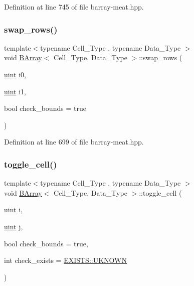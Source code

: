Definition at line 745 of file barray-\/meat.\+hpp.

\mbox{\label{class_b_array_a742773803481c18e2865b2b2a1e68949}} 
\subsubsection{\texorpdfstring{swap\+\_\+rows()}{swap\_rows()}}
{\footnotesize\ttfamily template$<$typename Cell\+\_\+\+Type , typename Data\+\_\+\+Type $>$ \\
void \hyperlink{class_b_array}{B\+Array}$<$ Cell\+\_\+\+Type, Data\+\_\+\+Type $>$\+::swap\+\_\+rows (\begin{DoxyParamCaption}\item[{\hyperlink{typedefs_8hpp_a91ad9478d81a7aaf2593e8d9c3d06a14}{uint}}]{i0,  }\item[{\hyperlink{typedefs_8hpp_a91ad9478d81a7aaf2593e8d9c3d06a14}{uint}}]{i1,  }\item[{bool}]{check\+\_\+bounds = {\ttfamily true} }\end{DoxyParamCaption})\hspace{0.3cm}{\ttfamily [inline]}}



Definition at line 699 of file barray-\/meat.\+hpp.

\mbox{\label{class_b_array_a2ab2b200b329abc718cfb3574f566cf6}} 
\subsubsection{\texorpdfstring{toggle\+\_\+cell()}{toggle\_cell()}}
{\footnotesize\ttfamily template$<$typename Cell\+\_\+\+Type , typename Data\+\_\+\+Type $>$ \\
void \hyperlink{class_b_array}{B\+Array}$<$ Cell\+\_\+\+Type, Data\+\_\+\+Type $>$\+::toggle\+\_\+cell (\begin{DoxyParamCaption}\item[{\hyperlink{typedefs_8hpp_a91ad9478d81a7aaf2593e8d9c3d06a14}{uint}}]{i,  }\item[{\hyperlink{typedefs_8hpp_a91ad9478d81a7aaf2593e8d9c3d06a14}{uint}}]{j,  }\item[{bool}]{check\+\_\+bounds = {\ttfamily true},  }\item[{int}]{check\+\_\+exists = {\ttfamily \hyperlink{namespace_e_x_i_s_t_s_a81eb362d951445c658942a433afddb97}{E\+X\+I\+S\+T\+S\+::\+U\+K\+N\+O\+WN}} }\end{DoxyParamCaption})\hspace{0.3cm}{\ttfamily [inline]}}



